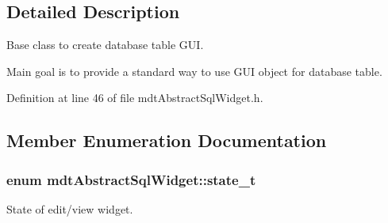 \subsection{Detailed Description}
Base class to create database table G\-U\-I. 

Main goal is to provide a standard way to use G\-U\-I object for database table. 

Definition at line 46 of file mdt\-Abstract\-Sql\-Widget.\-h.



\subsection{Member Enumeration Documentation}
\hypertarget{classmdt_abstract_sql_widget_a54e6a7f2b41fb3edfa1e4ed62abf4072}{
\subsubsection[{state\-\_\-t}]{\setlength{\rightskip}{0pt plus 5cm}enum {\bf mdt\-Abstract\-Sql\-Widget\-::state\-\_\-t}}}\label{classmdt_abstract_sql_widget_a54e6a7f2b41fb3edfa1e4ed62abf4072}


State of edit/view widget. 

